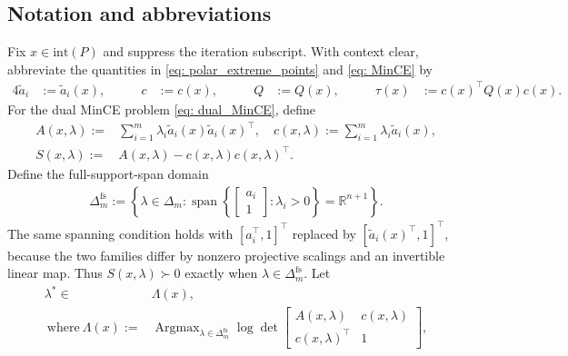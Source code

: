 \documentclass[smallextended]{svjour3}
\DeclareMathOperator*{\Argmax}{Argmax}
\newcommand{\R}{\mathbb{R}}
\newcommand{\E}{\mathcal{E}}
\begin{document}
\subsection{Notation and abbreviations}\label{sect: proof_notations}
Fix $x\in\mathrm{int}(P)$ and suppress the iteration subscript. With context
clear, abbreviate the quantities in \eqref{eq: polar_extreme_points} and \eqref{eq: MinCE} by
\begin{alignat}{4}\label{eq: MinCE_abbrev}
    \tilde{a}_i & := \tilde{a}_i(x), \qquad
    & c &:= c(x), \qquad
    & Q &:= Q(x), \qquad
    & \tau(x) &:= c(x)^\top Q(x)c(x).
\end{alignat}
For the dual MinCE problem \eqref{eq: dual_MinCE}, define
\begin{subequations}\label{eq: dual_MinCE_quantities}
\begin{align}
    A(x, \lambda) :=  & \sum_{i=1}^m \lambda_i \tilde{a}_i(x) \tilde{a}_i(x)^\top, \quad
    c(x, \lambda) :=  \sum_{i=1}^m \lambda_i \tilde{a}_i(x), \\
    S(x, \lambda) :=  & A(x,\lambda) - c(x,\lambda)c(x, \lambda)^\top.
\end{align}
\end{subequations}
Define the full-support-span domain
\begin{align}
    \Delta_m^{\mathrm{fs}}
    :=
    \left\{\lambda\in\Delta_m:
    \operatorname{span}\left\{
    \begin{bmatrix}a_i\\1\end{bmatrix}:\lambda_i>0
    \right\}=\R^{n+1}\right\}.
\end{align}
The same spanning condition holds with
$[a_i^\top,1]^\top$ replaced by $[\tilde a_i(x)^\top,1]^\top$, because the
two families differ by nonzero projective scalings and an invertible linear
map. Thus $S(x,\lambda)\succ0$ exactly when
$\lambda\in\Delta_m^{\mathrm{fs}}$.
Let
\begin{subequations}\label{eq: dual_MinCE_solution_set}
\begin{align}
    \lambda^* \in & \Lambda(x), \\
    ~\text{where}~ \Lambda(x) := &  \Argmax_{\lambda \in \Delta_m^{\mathrm{fs}}} \log \det
    \begin{bmatrix}
        A(x, \lambda) & c(x, \lambda) \\
        c(x, \lambda)^\top & 1
    \end{bmatrix},
\end{align}
\end{subequations}
\end{document}
